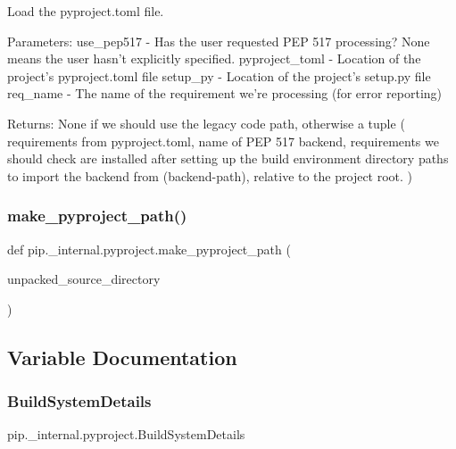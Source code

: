 \begin{DoxyVerb}Load the pyproject.toml file.

Parameters:
    use_pep517 - Has the user requested PEP 517 processing? None
                 means the user hasn't explicitly specified.
    pyproject_toml - Location of the project's pyproject.toml file
    setup_py - Location of the project's setup.py file
    req_name - The name of the requirement we're processing (for
               error reporting)

Returns:
    None if we should use the legacy code path, otherwise a tuple
    (
        requirements from pyproject.toml,
        name of PEP 517 backend,
        requirements we should check are installed after setting
            up the build environment
        directory paths to import the backend from (backend-path),
            relative to the project root.
    )
\end{DoxyVerb}
 \mbox{\label{namespacepip_1_1__internal_1_1pyproject_aa0250284deda8acb0915feb29cbf0fc9}} 
\subsubsection{\texorpdfstring{make\+\_\+pyproject\+\_\+path()}{make\_pyproject\_path()}}
{\footnotesize\ttfamily def pip.\+\_\+internal.\+pyproject.\+make\+\_\+pyproject\+\_\+path (\begin{DoxyParamCaption}\item[{}]{unpacked\+\_\+source\+\_\+directory }\end{DoxyParamCaption})}



\subsection{Variable Documentation}
\mbox{\label{namespacepip_1_1__internal_1_1pyproject_a274d06001ee00ebc1024f50fe1cc1d05}} 
\subsubsection{\texorpdfstring{Build\+System\+Details}{BuildSystemDetails}}
{\footnotesize\ttfamily pip.\+\_\+internal.\+pyproject.\+Build\+System\+Details}

